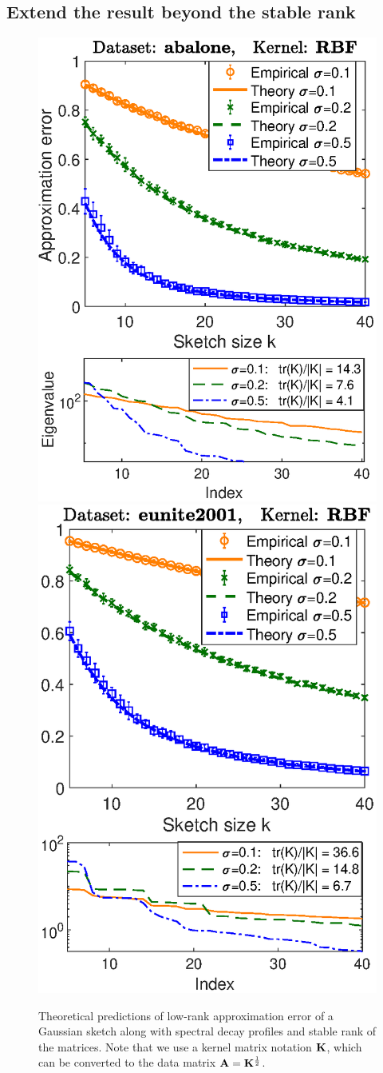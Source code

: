 \documentclass[11pt]{article}
\begin{document}
\subsection{Extend the result beyond the stable rank}
\begin{figure}[h]
  \centering
\includegraphics[width=.4\textwidth]{../equivalents_nips/abalone-nystrom}\nobreak\includegraphics[width=.4\textwidth]{../equivalents_nips/eunite-nystrom}
\caption{
Theoretical predictions of low-rank approximation error of a Gaussian
sketch along with spectral decay profiles and stable rank of the
matrices. Note that we use a kernel matrix notation $\mathbf K$, which can be
converted to the data matrix $\mathbf A=\mathbf K^{\frac12}$. 
}
\label{f:explicit}
\end{figure}
\end{document}
